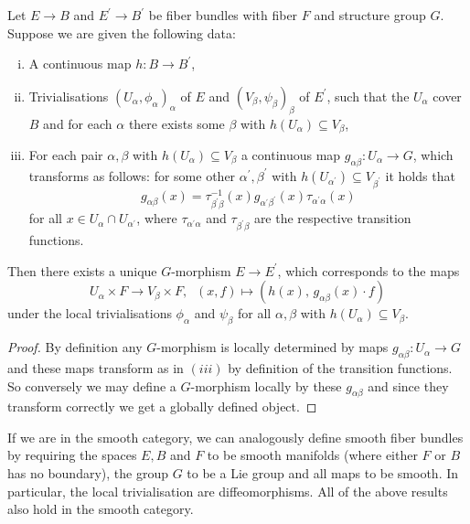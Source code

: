      \begin{proposition}
        \label{fiber_bundles:prop:construction_of_morphisms}
        Let $E \to B$ and $E^\prime \to B^\prime$ be fiber bundles with fiber $F$ and structure group $G$. Suppose we are given the following data:
        \begin{enumerate}[(i)]
            \item A continuous map $h \colon B \to B^\prime$,
            \item Trivialisations $(U_\alpha,\phi_\alpha)_{\alpha}$ of $E$ and $(V_\beta,\psi_\beta)_{\beta}$ of $E^\prime$, such that the $U_\alpha$ cover $B$ and for each $\alpha$ there exists some $\beta$ with $h(U_\alpha) \subseteq V_\beta$,
            \item For each pair $\alpha,\beta$ with $h(U_\alpha) \subseteq V_\beta$ a continuous map $g_{\alpha\beta} \colon U_\alpha \to G$, which transforms as follows: for some other $\alpha^\prime,\beta^\prime$ with $h(U_{\alpha^\prime}) \subseteq V_{\beta^\prime}$ it holds that 
            \[
            g_{\alpha\beta}(x) = \tau^{-1}_{\beta^\prime\beta}(x) g_{\alpha^\prime\beta^\prime}(x) \tau_{\alpha^\prime\alpha}(x)
            \]
            for all $x \in U_\alpha \cap U_{\alpha^\prime}$, where $\tau_{\alpha^\prime\alpha}$ and $\tau_{\beta^\prime\beta}$ are the respective transition functions.
        \end{enumerate}
        Then there exists a unique $G$-morphism $E \to E^\prime$, which corresponds to the maps 
        \[
        U_\alpha \times F \to V_\beta \times F, \; \; (x,f) \mapsto (h(x), \, g_{\alpha\beta}(x) \cdot f)
        \]
        under the local trivialisations $\phi_\alpha$ and $\psi_\beta$ for all $\alpha, \beta$ with $h(U_\alpha) \subseteq V_\beta$.     \end{proposition}

        \begin{proof}
            By definition any $G$-morphism is locally determined by maps $g_{\alpha\beta} \colon U_\alpha \to G$ and these maps transform as in $(iii)$ by definition of the transition functions. So conversely we may define a $G$-morphism locally by these $g_{\alpha\beta}$ and since they transform correctly we get a globally defined object.
        \end{proof}


        \noindent If we are in the smooth category, we can analogously define smooth fiber bundles by requiring the spaces $E ,B$ and $F$ to be smooth manifolds (where either $F$ or $B$ has no boundary), the group $G$ to be a Lie group and all maps to be smooth. In particular, the local trivialisation are diffeomorphisms. All of the above results also hold in the smooth category. 

